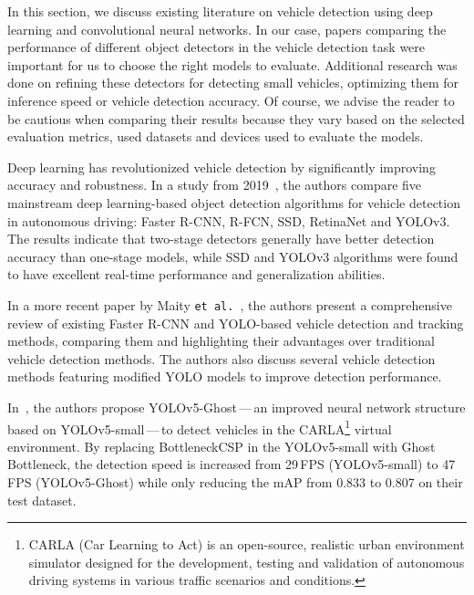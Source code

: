 In this section, we discuss existing literature on vehicle detection using deep
learning and convolutional neural networks. In our case, papers comparing the
performance of different object detectors in the vehicle detection task were
important for us to choose the right models to evaluate. Additional research was
done on refining these detectors for detecting small vehicles, optimizing them
for inference speed or vehicle detection accuracy. Of course, we advise the
reader to be cautious when comparing their results because they vary based on
the selected evaluation metrics, used datasets and devices used to evaluate the
models.

Deep learning has revolutionized vehicle detection by significantly improving
accuracy and robustness. In a study from 2019~\cite{Wang2019}, the authors
compare five mainstream deep learning-based object detection algorithms for
vehicle detection in autonomous driving: Faster R-CNN, R-FCN, SSD, RetinaNet
and YOLOv3. The results indicate that two-stage detectors generally have better
detection accuracy than one-stage models, while SSD and YOLOv3 algorithms were
found to have excellent real-time performance and generalization abilities. 

In a more recent paper by Maity \texttt{et al.}~\cite{Maity2021},
the authors present a comprehensive review of existing Faster R-CNN and
YOLO-based vehicle detection and tracking methods, comparing them and
highlighting their advantages over traditional vehicle detection methods. The
authors also discuss several vehicle detection methods featuring modified YOLO
models to improve detection performance.

In~\cite{Wu2021}, the authors propose YOLOv5-Ghost\,---\,an improved neural
network structure based on YOLOv5-small\,---\,to detect vehicles in the
CARLA\footnote{CARLA (Car Learning to Act) is an open-source, realistic urban
environment simulator designed for the development, testing and validation of
autonomous driving systems in various traffic scenarios and conditions.} virtual
environment. By replacing BottleneckCSP in the YOLOv5-small with Ghost
Bottleneck, the detection speed is increased from 29\,FPS (YOLOv5-small) to 47\,FPS
(YOLOv5-Ghost) while only reducing the mAP from \num{0.833} to \num{0.807}
on their test dataset.














